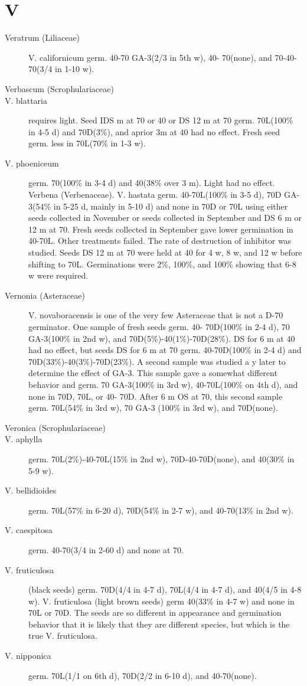 \section{V}
\begin{description}

\item[Veratrum (Liliaceae)] V. californicum germ. 40-70 GA-3(2/3 in 5th w), 40-
70(none), and 70-40-70(3/4 in 1-10 w).

\item[Verbascum (Scrophulariaceae)]
\item[V. blattaria] requires light. Seed IDS m at 70 or 40 or DS 12 m at 70 germ.
70L(100\% in 4-5 d) and 70D(3\%), and aprior 3m at 40 had no effect. Fresh seed
germ. less in 70L(70\% in 1-3 w).
\item[V. phoeniceum] germ. 70(100\% in 3-4 d) and 40(38\% over 3 m). Light had no
effect. Verbena (Verbenaceae). V. hastata germ. 40-70L(100\% in 3-5 d), 70D GA-
3(54\% in 5-25 d, mainly in 5-10 d) and none in 70D or 70L using either seeds
collected in November or seeds collected in September and DS 6 m or 12 m at 70.
Fresh seeds collected in September gave lower germination in 40-70L. Other
treatments failed. The rate of destruction of inhibitor was studied. Seeds DS 12 m at
70 were held at 40 for 4 w, 8 w, and 12 w before shifting to 70L. Germinations were
2\%, 100\%, and 100\% showing that 6-8 w were required.

\item[Vernonia (Asteraceae)] V. novaboracensis is one of the very few
Asteraceae that is not a D-70 germinator. One sample of fresh seeds germ. 40-
70D(100\% in 2-4 d), 70 GA-3(100\% in 2nd w), and 70D(5\%)-40(1\%)-70D(28\%). DS
for 6 m at 40 had no effect, but seeds DS for 6 m at 70 germ. 40-70D(100\% in 2-4 d)
and 70D(33\%)-40(3\%)-70D(23\%). A second sample was studied a y later to
determine the effect of GA-3. This sample gave a somewhat different behavior and
germ. 70 GA-3(100\% in 3rd w), 40-70L(100\% on 4th d), and none in 70D, 70L, or 40-
70D. After 6 m OS at 70, this second sample germ. 70L(54\% in 3rd w), 70 GA-3
(100\% in 3rd w), and 70D(none).

\item[Veronica (Scrophulariaceae)]
\item[V. aphylla] germ. 70L(2\%)-40-70L(15\% in 2nd w), 70D-40-70D(none), and
40(30\% in 5-9 w).
\item[V. bellidioides] germ. 70L(57\% in 6-20 d), 70D(54\% in 2-7 w), and 40-70(13\% in
2nd w).
\item[V. caespitosa] germ. 40-70(3/4 in 2-60 d) and none at 70.
\item[V. fruticulosa] (black seeds) germ. 70D(4/4 in 4-7 d), 70L(4/4 in 4-7 d), and
40(4/5 in 4-8 w). V. fruticulosa (light brown seeds) germ 40(33\% in 4-7 w) and none
in 70L or 70D. The seeds are so different in appearance and germination behavior
that it is likely that they are different species, but which is the true V. fruticulosa.
\item[V. nipponica] germ. 70L(1/1 on 6th d), 70D(2/2 in 6-10 d), and 40-70(none).


\end{description}
